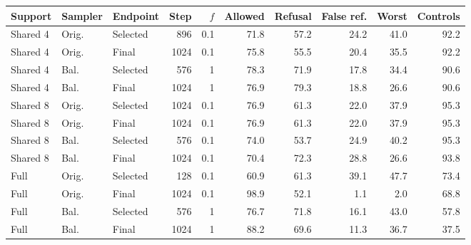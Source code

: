 \begin{tabular}{lllrrrrrrr}
\toprule
Support & Sampler & Endpoint & Step & $f$ & Allowed & Refusal & False ref. & Worst & Controls \\
\midrule
Shared 4 & Orig. & Selected & 896 & 0.1 & 71.8 & 57.2 & 24.2 & 41.0 & 92.2 \\
Shared 4 & Orig. & Final & 1024 & 0.1 & 75.8 & 55.5 & 20.4 & 35.5 & 92.2 \\
Shared 4 & Bal. & Selected & 576 & 1 & 78.3 & 71.9 & 17.8 & 34.4 & 90.6 \\
Shared 4 & Bal. & Final & 1024 & 1 & 76.9 & 79.3 & 18.8 & 26.6 & 90.6 \\
Shared 8 & Orig. & Selected & 1024 & 0.1 & 76.9 & 61.3 & 22.0 & 37.9 & 95.3 \\
Shared 8 & Orig. & Final & 1024 & 0.1 & 76.9 & 61.3 & 22.0 & 37.9 & 95.3 \\
Shared 8 & Bal. & Selected & 576 & 0.1 & 74.0 & 53.7 & 24.9 & 40.2 & 95.3 \\
Shared 8 & Bal. & Final & 1024 & 0.1 & 70.4 & 72.3 & 28.8 & 26.6 & 93.8 \\
Full & Orig. & Selected & 128 & 0.1 & 60.9 & 61.3 & 39.1 & 47.7 & 73.4 \\
Full & Orig. & Final & 1024 & 0.1 & 98.9 & 52.1 & 1.1 & 2.0 & 68.8 \\
Full & Bal. & Selected & 576 & 1 & 76.7 & 71.8 & 16.1 & 43.0 & 57.8 \\
Full & Bal. & Final & 1024 & 1 & 88.2 & 69.6 & 11.3 & 36.7 & 37.5 \\
\bottomrule
\end{tabular}
